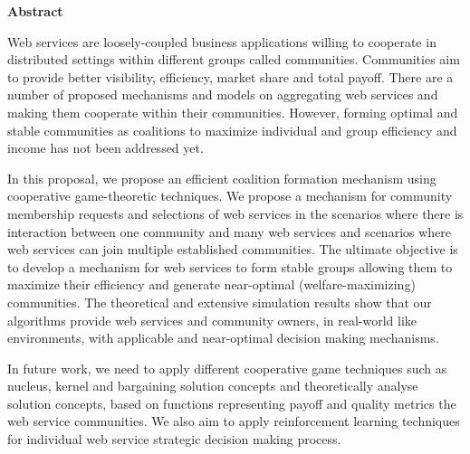 \begin{center}
{\LARGE\textbf{Abstract}}
\end{center}

Web services are loosely-coupled business applications willing to
cooperate in distributed settings within different groups called
communities. Communities aim to provide better visibility,
efficiency, market share and total payoff. There are a number of
proposed mechanisms and models on aggregating web services and
making them cooperate within their communities. However, forming
optimal and stable communities as coalitions to maximize
individual and group efficiency and income has not been addressed
yet. 

In this proposal, we propose an efficient coalition formation
mechanism using cooperative game-theoretic techniques. We propose
a mechanism for community membership requests and selections of
web services in the scenarios where there is interaction between one community and many web services
and scenarios where web services can join multiple established communities. The ultimate objective is to
develop a mechanism for web services to form stable groups
allowing them to maximize their efficiency and generate
near-optimal (welfare-maximizing) communities. The theoretical and
extensive simulation results show that our algorithms provide web services
and community owners, in real-world like environments, with applicable and near-optimal decision
making mechanisms.

In future work, we need to apply different cooperative game techniques such as nucleus, 
kernel and bargaining solution concepts and theoretically analyse solution concepts, 
based on functions representing payoff and quality metrics the web service communities. 
We also aim to apply reinforcement learning techniques for individual web service 
strategic decision making process.






















